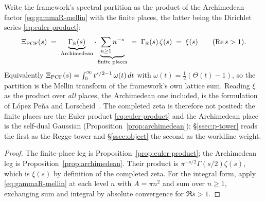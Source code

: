 \begin{theorem}\label{thm:places}
Write the framework's spectral partition as the product of the Archimedean factor
\eqref{eq:gammaR-mellin} with the finite places, the latter being the Dirichlet
series \eqref{eq:euler-product}:
\begin{equation}\label{eq:places-product}
  \Xi_{\mathrm{PCF}}(s)\;=\;\underbrace{\Gamma_{\mathbb{R}}(s)}_{\text{Archimedean}}\cdot
  \underbrace{\sum_{n\ge1}n^{-s}}_{\text{finite places}}
  \;=\;\Gamma_{\mathbb{R}}(s)\,\zeta(s)\;=\;\xi(s)\qquad(\operatorname{Re} s>1).
\end{equation}
Equivalently $\Xi_{\mathrm{PCF}}(s)=\int_{0}^{\infty}t^{s/2-1}\,\omega(t)\,dt$ with
$\omega(t)=\tfrac12(\Theta(t)-1)$, so the partition is the Mellin transform of the
framework's own lattice sum. Reading $\xi$ as the product over \emph{all} places, the Archimedean one included, is the
formulation of L\'opez Pe\~na and Lorscheid~\cite{LopezPenaLorscheid}. The completed zeta is
therefore not posited: the finite places are the Euler product \eqref{eq:euler-product} and the Archimedean place is the self-dual
Gaussian (Proposition~\ref{prop:archimedean}); \S\ref{ssec:p-tower} reads the first as the Regge
tower and \S\ref{ssec:object} the second as the worldline weight.

\end{theorem}
\begin{proof}
The finite-place leg is Proposition~\ref{prop:euler-product}; the Archimedean leg is
Proposition~\ref{prop:archimedean}. Their product is $\pi^{-s/2}\Gamma(s/2)\zeta(s)$,
which is $\xi(s)$ by definition of the completed zeta. For the integral form, apply
\eqref{eq:gammaR-mellin} at each level $n$ with $A=\pi n^{2}$ and sum over $n\ge1$,
exchanging sum and integral by absolute convergence for $\Re s>1$.
\end{proof}

